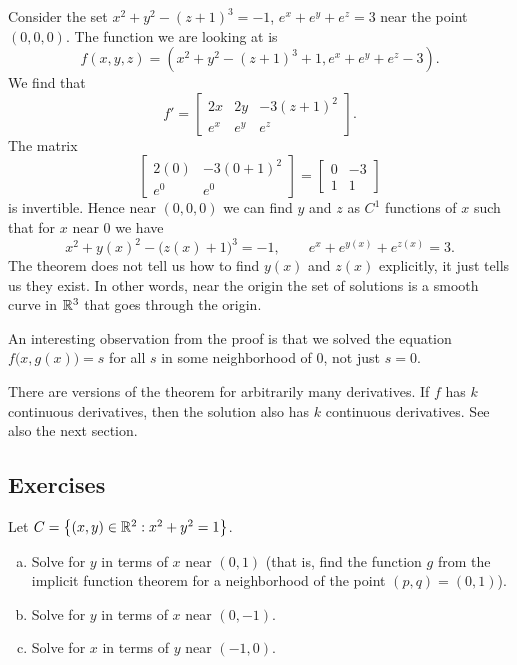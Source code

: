 \begin{example}
Consider the set $x^2+y^2-{(z+1)}^3 = -1$, $e^x+e^y+e^z = 3$
near the point $(0,0,0)$.
The function we are looking at is
\begin{equation*}
f(x,y,z) = (x^2+y^2-{(z+1)}^3+1,e^x+e^y+e^z-3) .
\end{equation*}
We find that
\begin{equation*}
f' =
\begin{bmatrix}
2x & 2y & -3{(z+1)}^2 \\
e^x & e^y & e^z
\end{bmatrix} .
\end{equation*}
The matrix
\begin{equation*}
\begin{bmatrix}
2(0) & -3{(0+1)}^2 \\
e^0 & e^0
\end{bmatrix}
=
\begin{bmatrix}
0 & -3 \\
1 & 1
\end{bmatrix}
\end{equation*}
is invertible.  Hence near $(0,0,0)$ we can find $y$ and $z$
as $C^1$ functions of $x$ such that for $x$ near 0 we have
\begin{equation*}
x^2+y(x)^2-{\bigl(z(x)+1\bigr)}^3 = -1,
\qquad
e^x+e^{y(x)}+e^{z(x)} = 3 .
\end{equation*}
The theorem does not tell us how to find $y(x)$ and $z(x)$ explicitly,
it just tells us they exist.
In other words, near the origin the set of solutions is a
smooth curve in ${\mathbb{R}}^3$ that goes through the origin.
\end{example}

An interesting observation from the proof is that we solved the equation
$f\bigl(x,g(x)\bigr) = s$ for all $s$ in some neighborhood of $0$, not just
$s=0$.

\begin{remark}
There are versions of the theorem for arbitrarily many derivatives.
If $f$ has $k$ continuous derivatives, then the solution also has $k$
continuous derivatives.  See also the next section.
\end{remark}


\subsection{Exercises}

\begin{exercise}
Let $C = \bigl\{ (x,y) \in {\mathbb{R}}^2 : x^2+y^2 = 1 \bigr\}$.
\begin{enumerate}[a)]
\item
Solve for $y$ in terms of $x$ near $(0,1)$ (that is, find the function $g$
from the implicit function theorem for a neighborhood of the point $(p,q) = (0,1)$).
\item
Solve for $y$ in terms of $x$ near $(0,-1)$.
\item
Solve for $x$ in terms of $y$ near $(-1,0)$.
\end{enumerate}
\end{exercise}

